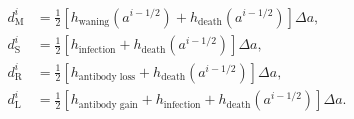 \documentclass[12pt]{article}
\begin{document}
\begin{subequations}
  \begin{align}
    d_{\mathrm{M}}^i
    &= \frac{1}{2} \left[h_{\text{waning}}(a^{i - 1 / 2})
      + h_{\text{death}}(a^{i - 1 / 2})\right]
      \Delta a,
    \\
    d_{\mathrm{S}}^i
    &= \frac{1}{2} \left[h_{\text{infection}}
      + h_{\text{death}}(a^{i - 1 / 2})\right]
      \Delta a,
    \\
    d_{\mathrm{R}}^i
    &= \frac{1}{2} \left[h_{\text{antibody loss}}
      + h_{\text{death}}(a^{i - 1 / 2})\right]
      \Delta a,
    \\
    d_{\mathrm{L}}^i
    &= \frac{1}{2} \left[h_{\text{antibody gain}}
      + h_{\text{infection}}
      + h_{\text{death}}(a^{i - 1 / 2})\right]
      \Delta a.
  \end{align}
\end{subequations}
\end{document}
